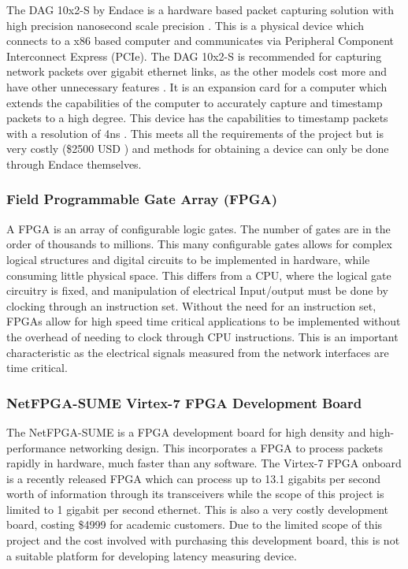 \par The DAG 10x2-S by Endace is a hardware based packet capturing solution with high precision nanosecond scale precision \cite{dagprecision}. 
This is a physical device which connects to a x86 based computer and communicates via Peripheral Component Interconnect Express (PCIe). 
The DAG 10x2-S is recommended for capturing network packets over gigabit ethernet links, as the other models cost more and have other unnecessary features \cite{dagfeatures}.
It is an expansion card for a computer which extends the capabilities of the computer to accurately capture and timestamp packets to a high degree. 
This device has the capabilities to timestamp packets with a resolution of 4ns \cite{dagprecision}. 
This meets all the requirements of the project but is very costly (\$2500 USD \cite{dagprice}) and methods for obtaining a device can only be done through Endace themselves. 

\subsubsection{Field Programmable Gate Array (FPGA)}

\par A FPGA is an array of configurable logic gates. The number of gates are in the order of thousands to
millions. This many configurable gates allows for complex logical structures and digital circuits to be
implemented in hardware, while consuming little physical space. This differs from a CPU, where the
logical gate circuitry is fixed, and manipulation of electrical Input/output must be done by clocking
through an instruction set. Without the need for an instruction set, FPGAs allow for high speed time
critical applications to be implemented without the overhead of needing to clock through CPU
instructions. This is an important characteristic as the electrical signals measured from the network
interfaces are time critical.

\subsubsection{NetFPGA-SUME Virtex-7 FPGA Development Board}

\par The NetFPGA-SUME is a FPGA development board for high density and high-performance networking design.
This incorporates a FPGA to process packets rapidly in hardware, much faster than any software.
The Virtex-7 FPGA onboard is a recently released FPGA which can process up to 13.1 gigabits per second worth 
of information through its transceivers while the scope of this project is limited to 1 gigabit per second 
ethernet.
This is also a very costly development board, costing \$4999 \cite{SUME} for academic customers. 
Due to the limited scope of this project and the cost involved with purchasing this development board, this is 
not a suitable platform for developing latency measuring device.

